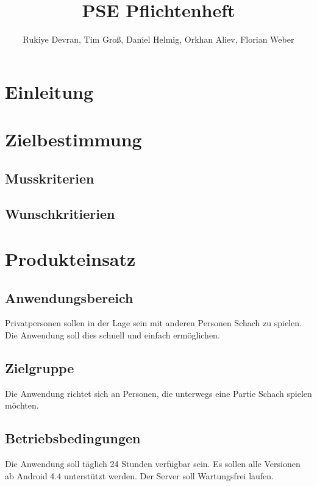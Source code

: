 \documentclass[parskip=full]{scrartcl}
\title{PSE Pflichtenheft}
\author{Rukiye Devran, Tim Groß, Daniel Helmig, Orkhan Aliev, Florian Weber}
\begin{document}
	\begin{titlepage}
	\maketitle	
	\tableofcontents
	
	\end{titlepage}
\section{Einleitung}
\section{Zielbestimmung}
\subsection{Musskriterien}
\subsection{Wunschkritierien}
\section{Produkteinsatz}
	\subsection{Anwendungsbereich}
		\begin{description}
			Privatpersonen sollen in der Lage sein mit anderen Personen Schach zu spielen. Die Anwendung soll dies schnell und einfach ermöglichen.	
		\end{description}
	\subsection{Zielgruppe}
		\begin{description}
			Die Anwendung richtet sich an Personen, die unterwegs eine Partie Schach spielen möchten.
		\end{description}
	\subsection{Betriebsbedingungen}
		\begin{description}
			Die Anwendung soll täglich 24 Stunden verfügbar sein.
			Es sollen alle Versionen ab Android 4.4 unterstützt werden.
			Der Server soll Wartungsfrei laufen.	
		\end{description}
\end{document}
